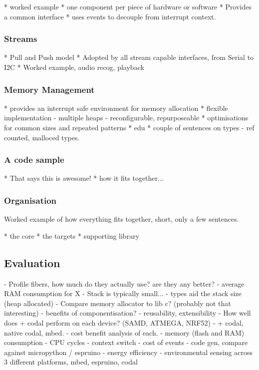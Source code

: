 * worked example
* one component per piece of hardware or software
* Provides a common interface
* uses events to decouple from interrupt context.

\subsubsection{Streams}

* Pull and Push model
* Adopted by all stream capable interfaces, from Serial to I2C
* Worked example, audio recog, playback

\subsubsection{Memory Management}

* provides an interrupt safe environment for memory allocation
* flexible implementation
    - multiple heaps
    - reconfigurable, repurposeable
* optimisations for common sizes and repeated patterns
* edu
* couple of sentences on types
    - ref counted, malloced types.

\subsubsection{A code sample}

* That says this is awesome!
* how it fits together...

\subsubsection{Organisation}

Worked example of how everything fits together, short, only a few sentences.

* the core
* the targets
* supporting library


\subsection{Evaluation}

- Profile fibers, how much do they actually use? are they any better?
    - average RAM consumption for X
    - Stack is typically small...
    - types aid the stack size (heap allocated)
- Compare memory allocator to lib c? (probably not that interesting)
- benefits of componentisation?
    - reusability, extensibility
- How well does \MC + codal perform on each device? (SAMD, ATMEGA, NRF52)
    - \MC + codal, native codal, mbed.
    - cost benefit analysis of each.
    - memory (flash and RAM) consumption
    - CPU cycles
        - context switch
        - cost of events
        - code gen, compare against micropython / espruino
    - energy efficiency
        - environmental sensing across 3 different platforms, mbed, espruino, codal